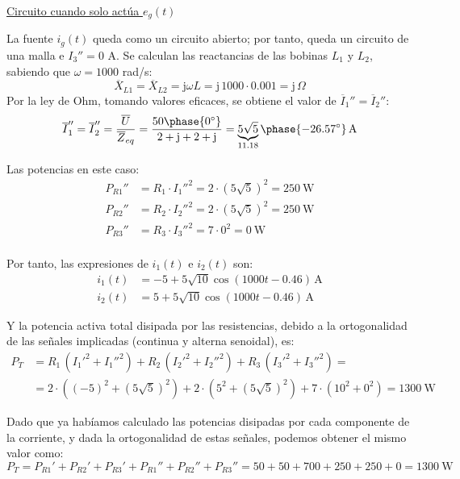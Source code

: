 \vspace{-2mm}
\underline{Circuito cuando solo actúa $e_g(t)$}

\vspace{2mm}    
La fuente $i_g(t)$ queda como un circuito abierto; por tanto, queda un
circuito de una malla e $I_3''=0$ A. Se calculan las reactancias de
las bobinas $L_1$ y $L_2$, sabiendo que $\omega=1000$ rad/s:
\begin{equation*}
  \overline{X}_{L1}=\overline{X}_{L2}=\mathrm{j}\omega L=\mathrm{j}\, 1000\cdot 0.001 = \mathrm{j}\,\Omega
\end{equation*}
Por la ley de Ohm, tomando valores eficaces, se obtiene el valor de
$\overline{I}_1''=\overline{I}_2''$:
\begin{equation*}
  \overline{I}_1''=\overline{I}_2''=\dfrac{\overline{U}}{\overline{Z}_{eq}}=\dfrac{50\phase{0^\circ}}{2+\mathrm{j}+2+\mathrm{j}}=\underbrace{5\sqrt{5}}_{11.18}\phase{-26.57^\circ} \,\si{\ampere}
\end{equation*}
    
Las potencias en este caso:
\begin{align*}
  P_{R1}''&=R_1\cdot I_1''^2=2\cdot (5\sqrt{5})^2=\qty{250}{\watt}\\
  P_{R2}''&=R_2\cdot I_2''^2=2\cdot (5\sqrt{5})^2=\qty{250}{\watt}\\
  P_{R3}''&=R_3\cdot I_3''^2=7\cdot 0^2=\qty{0}{\watt}\\
\end{align*}
    
\vspace{-2mm} 
Por tanto, las expresiones de $i_1(t)$ e $i_2(t)$ son:
\begin{align*}
  i_1(t)&= -5+5\sqrt{10}\cos(1000t-0.46) \,\si{\ampere} \\
  i_2(t)&= 5+5\sqrt{10}\cos(1000t-0.46) \,\si{\ampere}
\end{align*}

Y la potencia activa total disipada por las resistencias, debido a la ortogonalidad de las señales implicadas (continua y alterna senoidal), es:
\begin{align*}
  P_T&=R_1\,(I_1'^2+I_1''^2)+R_2\,(I_2'^2+I_2''^2)+R_3\,(I_3'^2+I_3''^2)=\\
     &=2\cdot((-5)^2+(5\sqrt{5})^2)+2\cdot(5^2+(5\sqrt{5})^2)+7\cdot (10^2+0^2)= \qty{1300}{\watt}
\end{align*}

\vspace{2mm} 
Dado que ya habíamos calculado las potencias disipadas por cada componente de la corriente, y dada la ortogonalidad de estas señales, podemos obtener el mismo valor como: 
\begin{equation*}
  P_T=P_{R1}'+P_{R2}'+P_{R3}'+P_{R1}''+P_{R2}''+P_{R3}''=50+50+700+250+250+0= \qty{1300}{\watt}
\end{equation*}

